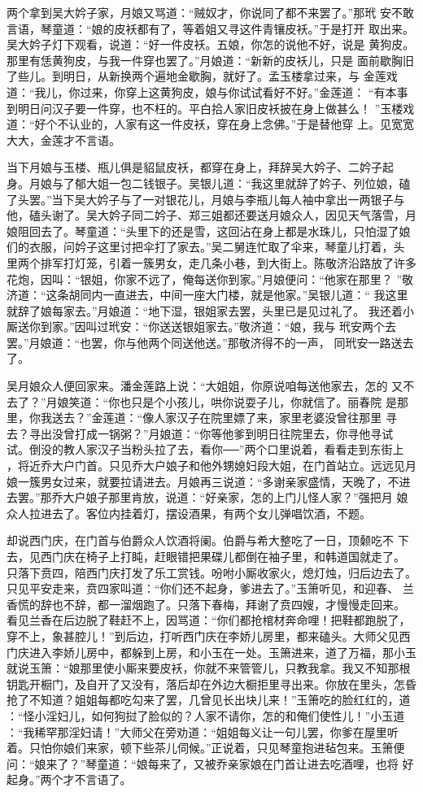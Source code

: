 两个拿到吴大妗子家，月娘又骂道：“贼奴才，你说同了都不来罢了。”那玳
安不敢言语，琴童道：“娘的皮袄都有了，等着姐又寻这件青镶皮袄。”于是打开
取出来。吴大妗子灯下观看，说道：“好一件皮袄。五娘，你怎的说他不好，说是
黄狗皮。那里有恁黄狗皮，与我一件穿也罢了。”月娘道：“新新的皮袄儿，只是
面前歇胸旧了些儿。到明日，从新换两个遍地金歇胸，就好了。孟玉楼拿过来，与
金莲戏道：“我儿，你过来，你穿上这黄狗皮，娘与你试试看好不好。”金莲道：
“有本事到明日问汉子要一件穿，也不枉的。平白拾人家旧皮袄披在身上做甚么！
”玉楼戏道：“好个不认业的，人家有这一件皮袄，穿在身上念佛。”于是替他穿
上。见宽宽大大，金莲才不言语。

当下月娘与玉楼、瓶儿俱是貂鼠皮袄，都穿在身上，拜辞吴大妗子、二妗子起
身。月娘与了郁大姐一包二钱银子。吴银儿道：“我这里就辞了妗子、列位娘，磕
了头罢。”当下吴大妗子与了一对银花儿，月娘与李瓶儿每人袖中拿出一两银子与
他，磕头谢了。吴大妗子同二妗子、郑三姐都还要送月娘众人，因见天气落雪，月
娘阻回去了。琴童道：“头里下的还是雪，这回沾在身上都是水珠儿，只怕湿了娘
们的衣服，问妗子这里讨把伞打了家去。”吴二舅连忙取了伞来，琴童儿打着，头
里两个排军打灯笼，引着一簇男女，走几条小巷，到大街上。陈敬济沿路放了许多
花炮，因叫：“银姐，你家不远了，俺每送你到家。”月娘便问：“他家在那里？
”敬济道：“这条胡同内一直进去，中间一座大门楼，就是他家。”吴银儿道：“
我这里就辞了娘每家去。”月娘道：“地下湿，银姐家去罢，头里已是见过礼了。
我还着小厮送你到家。”因叫过玳安：“你送送银姐家去。”敬济道：“娘，我与
玳安两个去罢。”月娘道：“也罢，你与他两个同送他送。”那敬济得不的一声，
同玳安一路送去了。

吴月娘众人便回家来。潘金莲路上说：“大姐姐，你原说咱每送他家去，怎的
又不去了？”月娘笑道：“你也只是个小孩儿，哄你说耍子儿，你就信了。丽春院
是那里，你我送去？”金莲道：“像人家汉子在院里嫖了来，家里老婆没曾往那里
寻去？寻出没曾打成一锅粥？”月娘道：“你等他爹到明日往院里去，你寻他寻试
试。倒没的教人家汉子当粉头拉了去，看你──”两个口里说着，看看走到东街上
，将近乔大户门首。只见乔大户娘子和他外甥媳妇段大姐，在门首站立。远远见月
娘一簇男女过来，就要拉请进去。月娘再三说道：“多谢亲家盛情，天晚了，不进
去罢。”那乔大户娘子那里肯放，说道：“好亲家，怎的上门儿怪人家？”强把月
娘众人拉进去了。客位内挂着灯，摆设酒果，有两个女儿弹唱饮酒，不题。

却说西门庆，在门首与伯爵众人饮酒将阑。伯爵与希大整吃了一日，顶颡吃不
下去，见西门庆在椅子上打盹，赶眼错把果碟儿都倒在袖子里，和韩道国就走了。
只落下贲四，陪西门庆打发了乐工赏钱。吩咐小厮收家火，熄灯烛，归后边去了。
只见平安走来，贲四家叫道：“你们还不起身，爹进去了。”玉箫听见，和迎春、
兰香慌的辞也不辞，都一溜烟跑了。只落下春梅，拜谢了贲四嫂，才慢慢走回来。
看见兰香在后边脱了鞋赶不上，因骂道：“你们都抢棺材奔命哩！把鞋都跑脱了，
穿不上，象甚腔儿！”到后边，打听西门庆在李娇儿房里，都来磕头。大师父见西
门庆进入李娇儿房中，都躲到上房，和小玉在一处。玉箫进来，道了万福，那小玉
就说玉箫：“娘那里使小厮来要皮袄，你就不来管管儿，只教我拿。我又不知那根
钥匙开橱门，及自开了又没有，落后却在外边大橱拒里寻出来。你放在里头，怎昏
抢了不知道？姐姐每都吃勾来了罢，几曾见长出块儿来！”玉箫吃的脸红红的，道
：“怪小淫妇儿，如何狗挝了脸似的？人家不请你，怎的和俺们使性儿！”小玉道
：“我稀罕那淫妇请！”大师父在旁劝道：“姐姐每义让一句儿罢，你爹在屋里听
着。只怕你娘们来家，顿下些茶儿伺候。”正说着，只见琴童抱进毡包来。玉箫便
问：“娘来了？”琴童道：“娘每来了，又被乔亲家娘在门首让进去吃酒哩，也将
好起身。”两个才不言语了。

